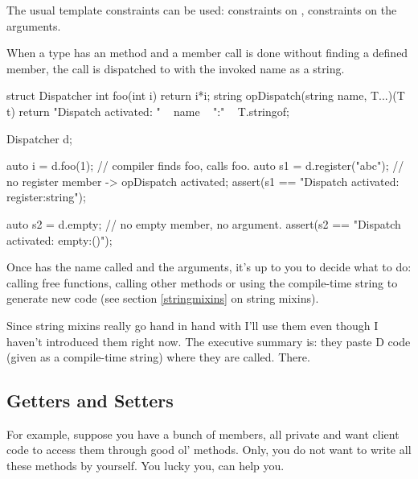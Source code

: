 The usual template constraints can be used: constraints on , constraints on the arguments.

When a type has an  method and a member call is done without finding a defined member, the call is dispatched to  with the invoked name as a string.

\begin{dcode}
struct Dispatcher
{
    int foo(int i) { return i*i;}
    string opDispatch(string name, T...)(T t)
    {
        return "Dispatch activated: " ~ name ~ ":" ~ T.stringof;
    }
}

Dispatcher d;

auto i = d.foo(1); // compiler finds foo, calls foo.
auto s1 = d.register("abc"); // no register member -> opDispatch activated;
assert(s1 == "Dispatch activated: register:string");

auto s2 = d.empty; // no empty member, no argument.
assert(s2 == "Dispatch activated: empty:()");
\end{dcode}

Once  has the name called and the arguments, it's up to you to decide what to do: calling free functions, calling other methods or using the compile-time string to generate new code (see section \ref{stringmixins} on string mixins).

Since string mixins really go hand in hand with  I'll use them even though I haven't introduced them right now. The executive summary is: they paste D code (given as a compile-time string) where they are called. There.

\subsection{Getters and Setters}\label{opdispatchgetterssetters}

For example, suppose you have a bunch of members, all private and want client code to access them through good ol'  methods. Only, you do not want to write all these methods by yourself. You lucky you,  can help you.

